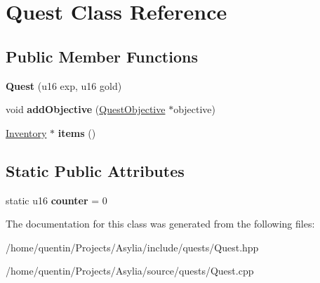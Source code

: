 \hypertarget{classQuest}{\section{Quest Class Reference}
\label{classQuest}
}
\subsection*{Public Member Functions}
\begin{DoxyCompactItemize}
\item 
\hypertarget{classQuest_a466310544e301430508002377e8c6d89}{{\bfseries Quest} (u16 exp, u16 gold)}\label{classQuest_a466310544e301430508002377e8c6d89}

\item 
\hypertarget{classQuest_a5f1e4f26812517bf218e290dec85accb}{void {\bfseries add\-Objective} (\hyperlink{classQuestObjective}{Quest\-Objective} $\ast$objective)}\label{classQuest_a5f1e4f26812517bf218e290dec85accb}

\item 
\hypertarget{classQuest_a571cae81f911bbb9944d334a636b0559}{\hyperlink{classInventory}{Inventory} $\ast$ {\bfseries items} ()}\label{classQuest_a571cae81f911bbb9944d334a636b0559}

\end{DoxyCompactItemize}
\subsection*{Static Public Attributes}
\begin{DoxyCompactItemize}
\item 
\hypertarget{classQuest_a6515264d74da1bbe92f4cc22b7bc679b}{static u16 {\bfseries counter} = 0}\label{classQuest_a6515264d74da1bbe92f4cc22b7bc679b}

\end{DoxyCompactItemize}


The documentation for this class was generated from the following files\-:\begin{DoxyCompactItemize}
\item 
/home/quentin/\-Projects/\-Asylia/include/quests/Quest.\-hpp\item 
/home/quentin/\-Projects/\-Asylia/source/quests/Quest.\-cpp\end{DoxyCompactItemize}
